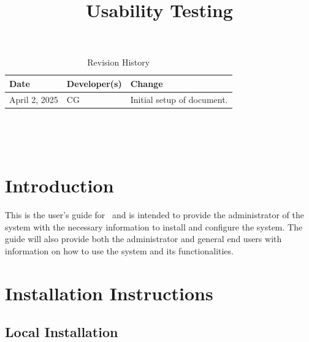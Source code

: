 \documentclass{article}
\title{Usability Testing\\\progname}
\author{\authname}
\date{}
\begin{document}
\begin{table}[hp]
\caption{Revision History} \label{TblRevisionHistory}
\begin{tabularx}{\textwidth}{llX}
\toprule
\textbf{Date} & \textbf{Developer(s)} & \textbf{Change}\\
\midrule
April 2, 2025 & CG & Initial setup of document.\\
\bottomrule
\end{tabularx}
\end{table}

\newpage

\maketitle

~\newpage


\tableofcontents

\listoffigures

~\newpage

\section{Introduction}
This is the user's guide for \progname\ and is intended to provide the administrator
of the system with the necessary information to install and configure the system.
The guide will also provide both the administrator and general end users with 
information on how to use the system and its functionalities.

\section{Installation Instructions}
    \subsection{Local Installation}
\end{document}
